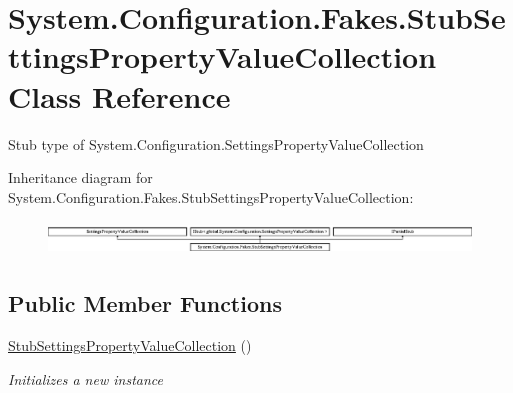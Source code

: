 \hypertarget{class_system_1_1_configuration_1_1_fakes_1_1_stub_settings_property_value_collection}{\section{System.\-Configuration.\-Fakes.\-Stub\-Settings\-Property\-Value\-Collection Class Reference}
\label{class_system_1_1_configuration_1_1_fakes_1_1_stub_settings_property_value_collection}
}


Stub type of System.\-Configuration.\-Settings\-Property\-Value\-Collection 


Inheritance diagram for System.\-Configuration.\-Fakes.\-Stub\-Settings\-Property\-Value\-Collection\-:\begin{figure}[H]
\begin{center}
\leavevmode
\includegraphics[height=0.897436cm]{class_system_1_1_configuration_1_1_fakes_1_1_stub_settings_property_value_collection}
\end{center}
\end{figure}
\subsection*{Public Member Functions}
\begin{DoxyCompactItemize}
\item 
\hyperlink{class_system_1_1_configuration_1_1_fakes_1_1_stub_settings_property_value_collection_ab7881ea6f9f323d5ef104d3b5d31bee8}{Stub\-Settings\-Property\-Value\-Collection} ()
\begin{DoxyCompactList}\small\item\em Initializes a new instance\end{DoxyCompactList}\end{DoxyCompactItemize}
